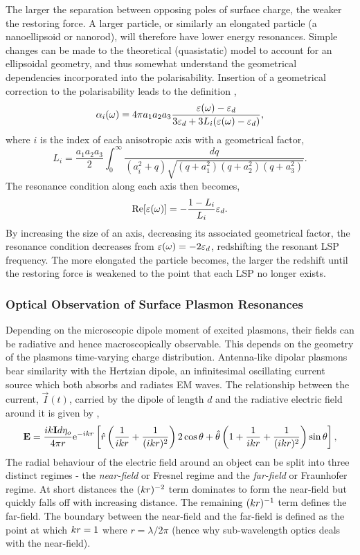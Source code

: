 \documentclass{article}
\begin{document}
The larger the separation between opposing poles of surface charge, the weaker the restoring force. A larger particle, or similarly an elongated particle (a nanoellipsoid or nanorod), will therefore have lower energy resonances. Simple changes can be made to the theoretical (quasistatic) model to account for an ellipsoidal geometry, and thus somewhat understand the geometrical dependencies incorporated into the polarisability. Insertion of a geometrical correction to the polarisability leads to the definition \cite{maier2007plasmonics, noguez2007},
\begin{equation}
	\alpha_i(\omega) = 4\pi a_1a_2a_3\frac{\varepsilon(\omega)-\varepsilon_d}{3\varepsilon_d+3L_i(\varepsilon(\omega)-\varepsilon_d)},
\end{equation}
where $i$ is the index of each anisotropic axis with a geometrical factor,
\begin{equation}
	L_i = \frac{a_1a_2a_3}{2}\int_0^\infty \frac{dq}{(a_i^2+q)\sqrt{(q+a_1^2)(q+a_2^2)(q+a_3^2)}}.
\end{equation}
The resonance condition along each axis then becomes,
\begin{equation}
	\mathrm{Re}\!\left[{\varepsilon(\omega)}\right] = -\frac{1 - L_i}{L_i}\varepsilon_d.
\end{equation}
By increasing the size of an axis, decreasing its associated geometrical factor, the resonance condition decreases from $\varepsilon(\omega)=-2\varepsilon_d$, redshifting the resonant LSP frequency. The more elongated the particle becomes, the larger the redshift until the restoring force is weakened to the point that each LSP no longer exists.

\subsubsection{Optical Observation of Surface Plasmon Resonances}

Depending on the microscopic dipole moment of excited plasmons, their fields can be radiative and hence macroscopically observable. This depends on the geometry of the plasmons time-varying charge distribution. Antenna-like dipolar plasmons bear similarity with the Hertzian dipole, an infinitesimal oscillating current source which both absorbs and radiates EM waves. The relationship between the current, $\vec{I}(t)$, carried by the dipole of length $d$ and the radiative electric field around it is given by \cite{grant2013electromagnetism},
\begin{equation}
	\mathbf{E} = \frac{ik\mathbf{I}d\eta_o}{4\pi r} \mathrm{e}^{-ikr} \left[ \hat{r} \left( \frac{1}{ikr} + \frac{1}{(ikr)^2} \right) 2\cos\theta + \hat{\theta} \left( 1 + \frac{1}{ikr} + \frac{1}{(ikr)^2} \right) \sin\theta \right],
\end{equation}
The radial behaviour of the electric field around an object can be split into three distinct regimes - the \emph{near-field} or Fresnel regime and the \emph{far-field} or Fraunhofer regime. At short distances the $(k r)^{-2}$ term dominates to form the near-field but quickly falls off with increasing distance. The remaining $(k r)^{-1}$ term defines the far-field. The boundary between the near-field and the far-field is defined as the point at which $k r=1$ where $r = \lambda/2\pi$ (hence why sub-wavelength optics deals with the near-field).
\end{document}
